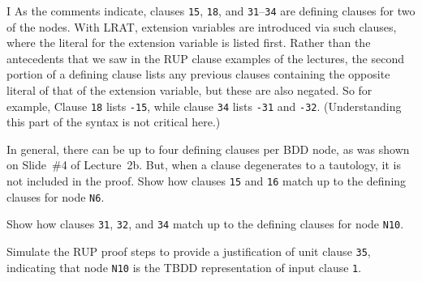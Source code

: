\begin{problem}{I}
As the comments indicate, clauses \texttt{15}, \texttt{18}, and \texttt{31}--\texttt{34} are defining
clauses for two of the nodes.  With LRAT, extension variables are
introduced via such clauses, where the literal for the extension variable is listed
first.  Rather than the antecedents that we saw in the RUP clause
examples of the lectures, the second portion of a defining clause
lists any previous clauses containing the opposite literal of that of
the extension variable, but these are also negated.  So for example,
Clause \texttt{18} lists \texttt{-15}, while clause \texttt{34}
lists \texttt{-31} and \texttt{-32}.  (Understanding this part of the
syntax is not critical here.)

\begin{choice}
\item In general, there can be up to four defining clauses per BDD node, as was shown on Slide~\#4 of Lecture~2b.
But, when a clause degenerates to a tautology, it is not included in
the proof.
Show how clauses \texttt{15} and \texttt{16} match up to the defining clauses for node \texttt{N6}.

\item
Show how clauses \texttt{31}, \texttt{32}, and \texttt{34} match up to the defining clauses for node \texttt{N10}.

\item
Simulate the RUP proof steps to provide a justification of
unit clause \texttt{35}, indicating that node \texttt{N10} is the TBDD representation of input clause \texttt{1}.
\end{choice}
\end{problem}


